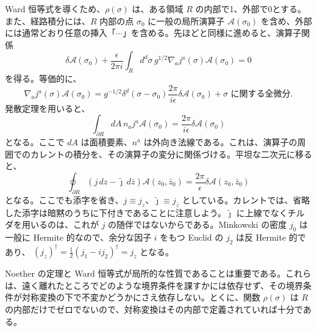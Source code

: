 Ward 恒等式を導くため、$\rho(\sigma)$ は、ある領域 $R$ の内部で1、外部で0とする。また、経路積分には、$R$ 内部の点 $\sigma_0$ に一般の局所演算子 $\mathcal A(\sigma_0)$ を含め、外部には通常どおり任意の挿入「$\cdots$」を含める。先ほどと同様に進めると、演算子関係
\begin{equation}
\delta\mathcal A(\sigma_0)
+\frac{\epsilon}{2\pi i}\int_Rd^d\sigma\,g^{1/2}
\nabla_aj^a(\sigma)\mathcal A(\sigma_0)=0
\tag{2.3.7}\label{eq:2.3.7}
\end{equation}
を得る。等価的に、
\begin{equation}
\nabla_aj^a(\sigma)\mathcal A(\sigma_0)
=g^{-1/2}\delta^d(\sigma-\sigma_0)\frac{2\pi}{i\epsilon}
\delta\mathcal A(\sigma_0)+\text{$\sigma$ に関する全微分}.
\tag{2.3.8}\label{eq:2.3.8}
\end{equation}
発散定理を用いると、
\begin{equation}
\int_{\partial R}dA\,n_aj^a\mathcal A(\sigma_0)
=\frac{2\pi}{i\epsilon}\delta\mathcal A(\sigma_0)
\tag{2.3.9}\label{eq:2.3.9}
\end{equation}
となる。ここで $dA$ は面積要素、$n^a$ は外向き法線である。これは、演算子の周囲でのカレントの積分を、その演算子の変分に関係づける。平坦な二次元に移ると、
\begin{equation}
\oint_{\partial R}(j\,dz-\tilde{\jmath}\,d\bar z)\mathcal A(z_0,\bar z_0)
=\frac{2\pi}{\epsilon}\delta\mathcal A(z_0,\bar z_0)
\tag{2.3.10}\label{eq:2.3.10}
\end{equation}
となる。ここでも添字を省き、$j\equiv j_z$、$\tilde{\jmath}\equiv j_{\bar z}$ としている。カレントでは、省略した添字は暗黙のうちに下付きであることに注意しよう。$\tilde{\jmath}$ に上線でなくチルダを用いるのは、これが $j$ の随伴ではないからである。Minkowski の密度 $j_0$ は一般に Hermite 的なので、余分な因子 $i$ をもつ Euclid の $j_2$ は反 Hermite 的であり、
$(j_z)^\dagger=\tfrac12(j_1-ij_2)^\dagger=j_z$ となる。

Noether の定理と Ward 恒等式が局所的な性質であることは重要である。これらは、遠く離れたところでどのような境界条件を課すかには依存せず、その境界条件が対称変換の下で不変かどうかにさえ依存しない。とくに、関数 $\rho(\sigma)$ は $R$ の内部だけでゼロでないので、対称変換はその内部で定義されていれば十分である。

